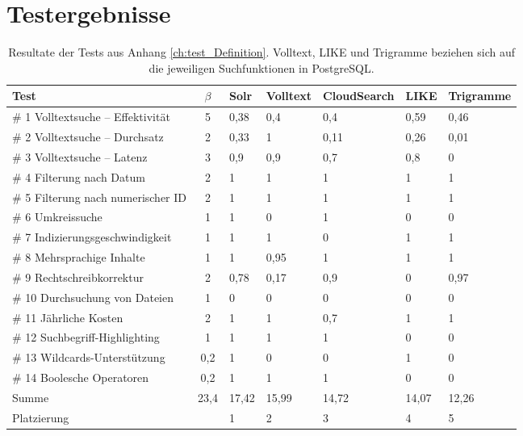 \chapter{Testergebnisse}
\label{ch:test_reults}


\renewcommand{\arraystretch}{1.2}
\begin{table}[ht!]
\centering
\begin{tabular}{l | c | lllll}
Test & $\beta$ & Solr & Volltext & CloudSearch & LIKE &  Trigramme \\
\hline
\# 1 Volltextsuche – Effektivität & 5 & 0,38 & 0,4 & 0,4 & 0,59 & 0,46 \\
\# 2 Volltextsuche – Durchsatz & 2 & 0,33 & 1 & 0,11 & 0,26 & 0,01 \\
\# 3 Volltextsuche – Latenz & 3 & 0,9 & 0,9 & 0,7 & 0,8 & 0 \\
\# 4 Filterung nach Datum & 2 & 1 & 1 & 1 & 1 & 1 \\
\# 5 Filterung nach numerischer ID & 2 & 1 & 1 & 1 & 1 & 1 \\
\# 6 Umkreissuche & 1 & 1 & 0 & 1 & 0 & 0 \\
\# 7 Indizierungsgeschwindigkeit & 1 & 1 & 1 & 0 & 1 & 1 \\
\# 8 Mehrsprachige Inhalte & 1 & 1 & 0,95 & 1 & 1 & 1 \\
\# 9 Rechtschreibkorrektur & 2 & 0,78 & 0,17 & 0,9 & 0 & 0,97 \\
\# 10 Durchsuchung von Dateien & 1 & 0 & 0 & 0 & 0 & 0 \\
\# 11 Jährliche Kosten & 2 & 1 & 1 & 0,7 & 1 & 1 \\
\# 12 Suchbegriff-Highlighting & 1 & 1 & 1 & 1 & 0 & 0 \\
\# 13 Wildcards-Unterstützung & 0,2 & 1 & 0 & 0 & 1 & 0 \\
\# 14 Boolesche Operatoren & 0,2 & 1 & 1 & 1 & 0 & 0 \\
\hline
\hline
Summe & 23,4 & 17,42 & 15,99 & 14,72 & 14,07 & 12,26 \\
Platzierung &  & 1 & 2 & 3 & 4 & 5

\end{tabular}
\caption[Testresultate]{Resultate der Tests aus Anhang \ref{ch:test_Definition}. Volltext, LIKE und Trigramme beziehen sich auf die jeweiligen Suchfunktionen in PostgreSQL.}
\label{tab:testresults}
\end{table}


